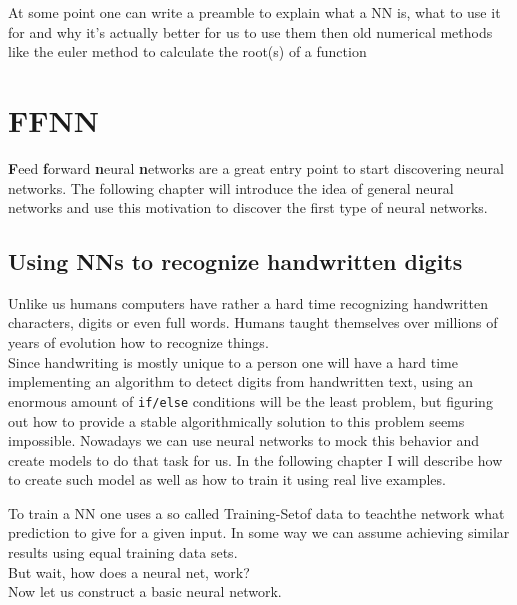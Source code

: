 \documentclass[10pt]{book}
\title{\ueberschrift}
\author{Philipp Zettl}
\begin{document}
    \pagestyle{fancy}
    \maketitle

    At some point one can write a preamble to explain what a NN is, what to use it for
    and why it's actually better for us to use them then old numerical methods like the euler method to
    calculate the root(s) of a function

    \chapter{FFNN}
    \textbf{F}eed \textbf{f}orward \textbf{n}eural \textbf{n}etworks are a great entry point to start discovering
    neural networks. The following chapter will introduce the idea of general neural networks and use this motivation
    to discover the first type of neural networks.
    \section{Using NNs to recognize handwritten digits}
    Unlike us humans computers have rather a hard time recognizing handwritten characters, digits or even full words.
    Humans taught themselves over millions of years of evolution how to recognize things.\\
    Since handwriting is mostly unique to a person one will have a hard time implementing an algorithm to detect digits from handwritten text,
    using an enormous amount of \lstinline{if/else} conditions will be the least problem, but figuring out how to provide a stable algorithmically solution
    to this problem seems impossible.
    Nowadays we can use neural networks to mock this behavior and create models to do that task for us.
    In the following chapter I will describe how to create such model as well as how to train it using real live
    examples.

    To train a NN one uses a so called \dq Training-Set\dq of data to \dq teach\dq the network what prediction to give for a given input. In some way we can assume
    achieving similar results using equal training data sets.\\
    But wait, how does a neural net, work?\\    
    Now let us construct a basic neural network.
\end{document}
